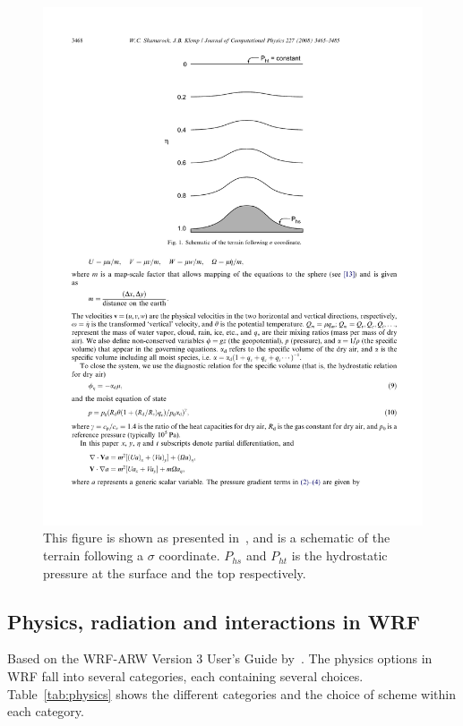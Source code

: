 \begin{figure}
\centering
\includegraphics[scale=1]{model_methods/sigma.pdf}
\caption{This figure is shown as presented in~\citet{Skamarock2008}, and is a schematic of the terrain following a $\sigma$ coordinate. $P_{hs}$ and $P_{ht}$ is the hydrostatic pressure at the surface and the top respectively.}
\label{fig:sigma}
\end{figure}

\subsection{Physics, radiation and interactions in WRF}
Based on the WRF-ARW Version 3 User's Guide by~\citet{Wang2015}.
The physics options in WRF fall into several categories, each containing several choices. Table~\ref{tab:physics} shows the different categories and the choice of scheme within each category.

